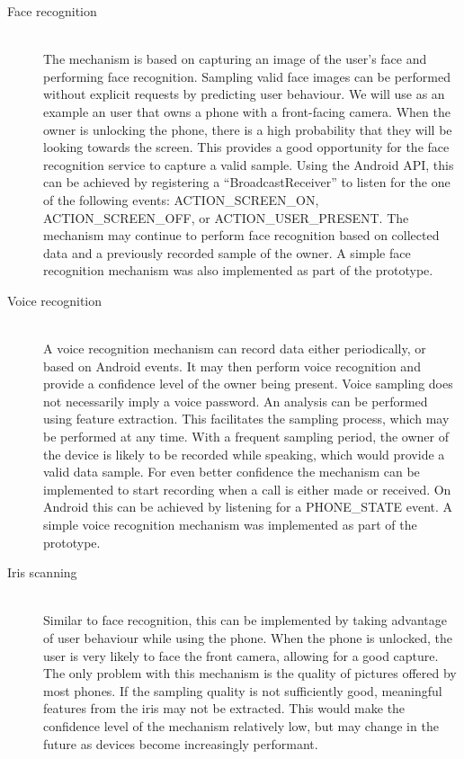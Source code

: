 \begin{description}
  \item[Face recognition] \hfill \\
  The mechanism is based on capturing an image of the user's face and performing face recognition. Sampling valid face images can be performed without explicit requests by predicting user behaviour. We will use as an example an user that owns a phone with a front-facing camera. When the owner is unlocking the phone, there is a high probability that they will be looking towards the screen. This provides a good opportunity for the face recognition service to capture a valid sample. Using the Android API, this can be achieved by registering a ``BroadcastReceiver'' to listen for the one of the following events: ACTION\_SCREEN\_ON, ACTION\_SCREEN\_OFF, or ACTION\_USER\_PRESENT. The mechanism may continue to perform face recognition based on collected data and a previously recorded sample of the owner. A simple face recognition mechanism was also implemented as part of the prototype.
  
  \item[Voice recognition] \hfill \\
  A voice recognition mechanism can record data either periodically, or based on Android events. It may then perform voice recognition and provide a confidence level of the owner being present. Voice sampling does not necessarily imply a voice password. An analysis can be performed using feature extraction. This facilitates the sampling process, which may be performed at any time. With a frequent sampling period, the owner of the device is likely to be recorded while speaking, which would provide a valid data sample. For even better confidence the mechanism can be implemented to start recording when a call is either made or received. On Android this can be achieved by listening for a PHONE\_STATE event. A simple voice recognition mechanism was implemented as part of the prototype.
  
  \item[Iris scanning] \hfill \\
  Similar to face recognition, this can be implemented by taking advantage of user behaviour while using the phone. When the phone is unlocked, the user is very likely to face the front camera, allowing for a good capture. The only problem with this mechanism is the quality of pictures offered by most phones. If the sampling quality is not sufficiently good, meaningful features from the iris may not be extracted. This would make the confidence level of the mechanism relatively low, but may change in the future as devices become increasingly performant.
  

\end{description}
